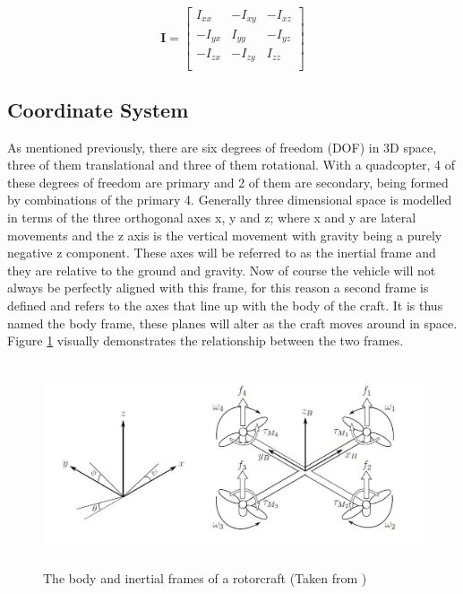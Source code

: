 \begin{equation}
\label{EQ_InertiaTensor}
\textbf{I} = 
\begin{bmatrix}
I_{xx}	& -I_{xy} & -I_{xz}\\
-I_{yx}	& I_{yy}	& -I_{yz}\\
-I_{zx}	& -I_{zy}	& I_{zz}\\
\end{bmatrix}
\end{equation}


\subsection{Coordinate System}
As mentioned previously, there are six degrees of freedom (DOF) in 3D space, three of them translational and three of them rotational. With a quadcopter, 4 of these degrees of freedom are primary and 2 of them are secondary, being formed by combinations of the primary 4. Generally three dimensional space is modelled in terms of the three orthogonal axes x, y and z; where x and y are lateral movements and the z axis is the vertical movement with gravity being a purely negative z component. These axes will be referred to as the inertial frame and they are relative to the ground and gravity. Now of course the vehicle will not always be perfectly aligned with this frame, for this reason a second frame is defined and refers to the axes that line up with the body of the craft. It is thus named the body frame, these planes will alter as the craft moves around in space. Figure \ref{IM_Frames} visually demonstrates the relationship between the two frames. 

\begin{figure}[H]
\centering
\includegraphics[height = 6cm]{Images/Literature/Frames.jpg}     
\caption{The body and inertial frames of a rotorcraft (Taken from \cite{Luukkonen})}
\label{IM_Frames}
\end{figure}

